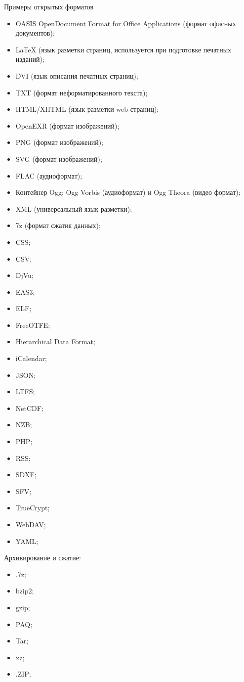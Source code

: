 \documentclass{ou}
\begin{document}
Примеры открытых форматов
\begin{itemize}
    \item OASIS OpenDocument Format for Office Applications (формат офисных документов);
    \item LaTeX (язык разметки страниц, используется при подготовке печатных изданий);
    \item DVI (язык описания печатных страниц);
    \item TXT (формат неформатированного текста);
    \item HTML/XHTML (язык разметки web-страниц);
    \item OpenEXR (формат изображений);
    \item PNG (формат изображений);
    \item SVG (формат изображений);
    \item FLAC (аудиоформат);
    \item Контейнер Ogg; Ogg Vorbis (аудиоформат) и Ogg Theora (видео формат);
    \item XML (универсальный язык разметки);
    \item 7z (формат сжатия данных);
    \item CSS;
    \item CSV;
    \item DjVu;
    \item EAS3;
    \item ELF;
    \item FreeOTFE;
    \item Hierarchical Data Format;
    \item iCalendar;
    \item JSON;
    \item LTFS;
    \item NetCDF;
    \item NZB;
    \item PHP;
    \item RSS;
    \item SDXF;
    \item SFV;
    \item TrueCrypt;
    \item WebDAV;
    \item YAML;
\end{itemize}

Архивирование и сжатие:
\begin{itemize}
    \item .7z;
    \item bzip2;
    \item gzip;
    \item PAQ;
    \item Tar;
    \item xz;
    \item .ZIP;
\end{itemize}
\end{document}
